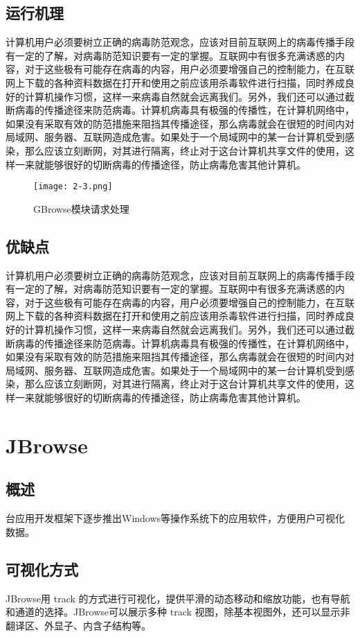 		\subsection{运行机理}
			计算机用户必须要树立正确的病毒防范观念，应该对目前互联网上的病毒传播手段有一定的了解，对病毒防范知识要有一定的掌握。互联网中有很多充满诱惑的内容，对于这些极有可能存在病毒的内容，用户必须要增强自己的控制能力，在互联网上下载的各种资料数据在打开和使用之前应该用杀毒软件进行扫描，同时养成良好的计算机操作习惯，这样一来病毒自然就会远离我们。另外，我们还可以通过截断病毒的传播途径来防范病毒。计算机病毒具有极强的传播性，在计算机网络中，如果没有采取有效的防范措施来阻挡其传播途径，那么病毒就会在很短的时间内对局域网、服务器、互联网造成危害。如果处于一个局域网中的某一台计算机受到感染，那么应该立刻断网，对其进行隔离，终止对于这台计算机共享文件的使用，这样一来就能够很好的切断病毒的传播途径，防止病毒危害其他计算机。
			\begin{figure}[!ht]
				\centering
				\texttt{[image: 2-3.png]}
				\caption{GBrowse模块请求处理}
			\end{figure}
		\subsection{优缺点}
			计算机用户必须要树立正确的病毒防范观念，应该对目前互联网上的病毒传播手段有一定的了解，对病毒防范知识要有一定的掌握。互联网中有很多充满诱惑的内容，对于这些极有可能存在病毒的内容，用户必须要增强自己的控制能力，在互联网上下载的各种资料数据在打开和使用之前应该用杀毒软件进行扫描，同时养成良好的计算机操作习惯，这样一来病毒自然就会远离我们。另外，我们还可以通过截断病毒的传播途径来防范病毒。计算机病毒具有极强的传播性，在计算机网络中，如果没有采取有效的防范措施来阻挡其传播途径，那么病毒就会在很短的时间内对局域网、服务器、互联网造成危害。如果处于一个局域网中的某一台计算机受到感染，那么应该立刻断网，对其进行隔离，终止对于这台计算机共享文件的使用，这样一来就能够很好的切断病毒的传播途径，防止病毒危害其他计算机。
	\section{JBrowse}
		\subsection{概述}
			台应用开发框架下逐步推出Windows等操作系统下的应用软件，方便用户可视化数据。
		\subsection{可视化方式}
			JBrowse用 track 的方式进行可视化，提供平滑的动态移动和缩放功能，也有导航和通道的选择。JBrowse可以展示多种 track 视图，除基本视图外，还可以显示非翻译区、外显子、内含子结构等。
		
